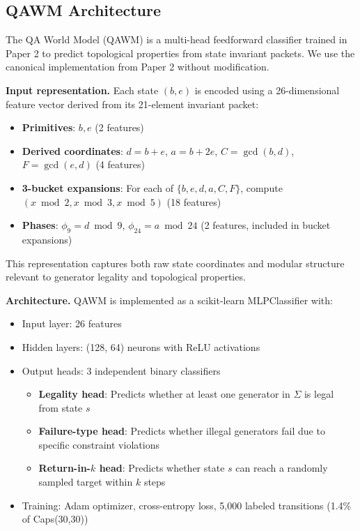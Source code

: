 \subsection{QAWM Architecture}

The QA World Model (QAWM) is a multi-head feedforward classifier trained in Paper 2 to predict topological properties from state invariant packets. We use the canonical implementation from Paper 2 without modification.

\textbf{Input representation.} Each state $(b,e)$ is encoded using a 26-dimensional feature vector derived from its 21-element invariant packet:

\begin{itemize}
\item \textbf{Primitives}: $b, e$ (2 features)
\item \textbf{Derived coordinates}: $d = b+e$, $a = b+2e$, $C = \gcd(b,d)$, $F = \gcd(e,d)$ (4 features)
\item \textbf{3-bucket expansions}: For each of $\{b,e,d,a,C,F\}$, compute $(x \bmod 2, x \bmod 3, x \bmod 5)$ (18 features)
\item \textbf{Phases}: $\phi_9 = d \bmod 9$, $\phi_{24} = a \bmod 24$ (2 features, included in bucket expansions)
\end{itemize}

This representation captures both raw state coordinates and modular structure relevant to generator legality and topological properties.

\textbf{Architecture.} QAWM is implemented as a scikit-learn MLPClassifier with:
\begin{itemize}
\item Input layer: 26 features
\item Hidden layers: (128, 64) neurons with ReLU activations
\item Output heads: 3 independent binary classifiers
  \begin{itemize}
  \item \textbf{Legality head}: Predicts whether at least one generator in $\Sigma$ is legal from state $s$
  \item \textbf{Failure-type head}: Predicts whether illegal generators fail due to specific constraint violations
  \item \textbf{Return-in-$k$ head}: Predicts whether state $s$ can reach a randomly sampled target within $k$ steps
  \end{itemize}
\item Training: Adam optimizer, cross-entropy loss, 5,000 labeled transitions (1.4\% of Caps(30,30))
\end{itemize}

